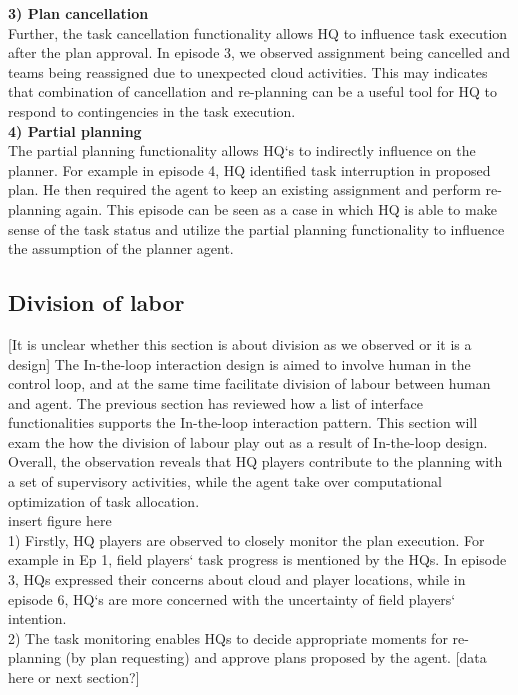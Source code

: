 \textbf{ 3) Plan cancellation }\\
Further, the task cancellation functionality allows HQ to influence task execution after the plan approval. In episode 3, we observed assignment being cancelled and teams being reassigned due to unexpected cloud activities. This may indicates that combination of cancellation and re-planning can be a useful tool for HQ to respond to contingencies in the task execution.\\

\textbf{ 4) Partial planning }\\
The partial planning functionality allows HQ`s to indirectly influence on the planner. For example in episode 4, HQ identified task interruption in proposed plan. He then required the agent to keep an existing assignment and perform re-planning again.  This episode can be seen as a case in which HQ is able to make sense of the task status and utilize the partial planning functionality to influence the assumption of the planner agent. 


\subsection{Division of labor }
[It is unclear whether this section is about division as we observed or it is a design]
The In-the-loop interaction design is aimed to involve human in the control loop, and at the same time facilitate division of labour between human and agent. The previous section has reviewed how a list of interface functionalities supports the In-the-loop interaction pattern. This section will exam the how the division of labour play out as a result of In-the-loop design. Overall, the observation reveals that HQ players contribute to the planning with a set of supervisory activities, while the agent take over computational optimization of task allocation. \\

insert figure here\\


1) Firstly, HQ players are observed to closely monitor the plan execution. For example in Ep 1, field players` task progress is mentioned by the HQs. In episode 3, HQs expressed their concerns about cloud and player locations, while in episode 6, HQ`s are more concerned with the uncertainty of field players` intention. \\

2) The task monitoring enables HQs to decide appropriate moments for re-planning (by plan requesting) and approve plans proposed by the agent. [data here or next section?]\\

